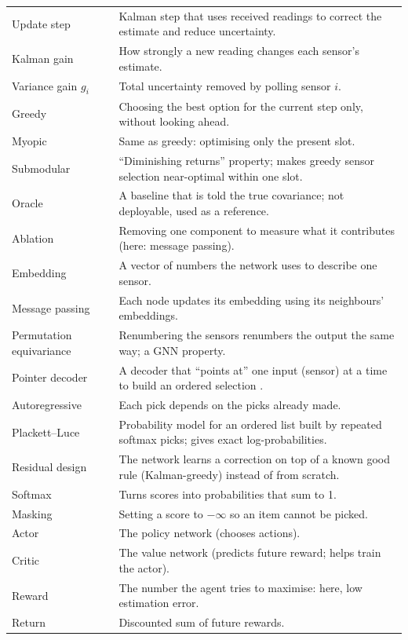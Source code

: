 {\begin{longtable}{@{}p{3.6cm}p{11.8cm}@{}}
Update step & Kalman step that uses received readings to correct the estimate and reduce uncertainty. \\
Kalman gain & How strongly a new reading changes each sensor's estimate. \\
Variance gain $g_i$ & Total uncertainty removed by polling sensor $i$. \\
Greedy & Choosing the best option for the current step only, without looking ahead. \\
Myopic & Same as greedy: optimising only the present slot. \\
Submodular & ``Diminishing returns'' property; makes greedy sensor selection near-optimal within one slot. \\
Oracle & A baseline that is told the true covariance; not deployable, used as a reference. \\
Ablation & Removing one component to measure what it contributes (here: message passing). \\
Embedding & A vector of numbers the network uses to describe one sensor. \\
Message passing & Each node updates its embedding using its neighbours' embeddings. \\
Permutation equivariance & Renumbering the sensors renumbers the output the same way; a GNN property. \\
Pointer decoder & A decoder that ``points at'' one input (sensor) at a time to build an ordered selection \cite{22}. \\
Autoregressive & Each pick depends on the picks already made. \\
Plackett--Luce & Probability model for an ordered list built by repeated softmax picks; gives exact log-probabilities. \\
Residual design & The network learns a correction on top of a known good rule (Kalman-greedy) instead of from scratch. \\
Softmax & Turns scores into probabilities that sum to 1. \\
Masking & Setting a score to $-\infty$ so an item cannot be picked. \\
Actor & The policy network (chooses actions). \\
Critic & The value network (predicts future reward; helps train the actor). \\
Reward & The number the agent tries to maximise: here, low estimation error. \\
Return & Discounted sum of future rewards. \\

\end{longtable}}
